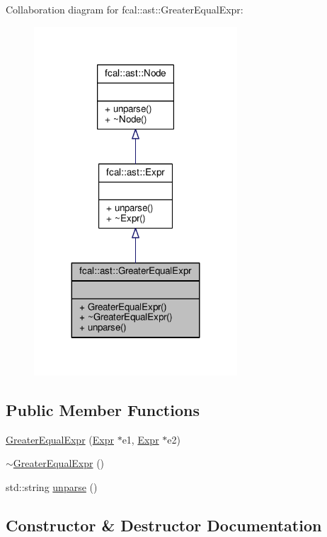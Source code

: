 Collaboration diagram for fcal\+:\+:ast\+:\+:Greater\+Equal\+Expr\+:
\nopagebreak
\begin{figure}[H]
\begin{center}
\leavevmode
\includegraphics[width=215pt]{classfcal_1_1ast_1_1GreaterEqualExpr__coll__graph}
\end{center}
\end{figure}
\subsection*{Public Member Functions}
\begin{DoxyCompactItemize}
\item 
\hyperlink{classfcal_1_1ast_1_1GreaterEqualExpr_a9dba923841463a370103372a14d337ff}{Greater\+Equal\+Expr} (\hyperlink{classfcal_1_1ast_1_1Expr}{Expr} $\ast$e1, \hyperlink{classfcal_1_1ast_1_1Expr}{Expr} $\ast$e2)
\item 
\hyperlink{classfcal_1_1ast_1_1GreaterEqualExpr_a3e5a0544dd116b53a0376324e7bf6ac0}{$\sim$\+Greater\+Equal\+Expr} ()
\item 
std\+::string \hyperlink{classfcal_1_1ast_1_1GreaterEqualExpr_a1ae9a0851f31b4740ffb8a35a9014478}{unparse} ()
\end{DoxyCompactItemize}


\subsection{Constructor \& Destructor Documentation}
